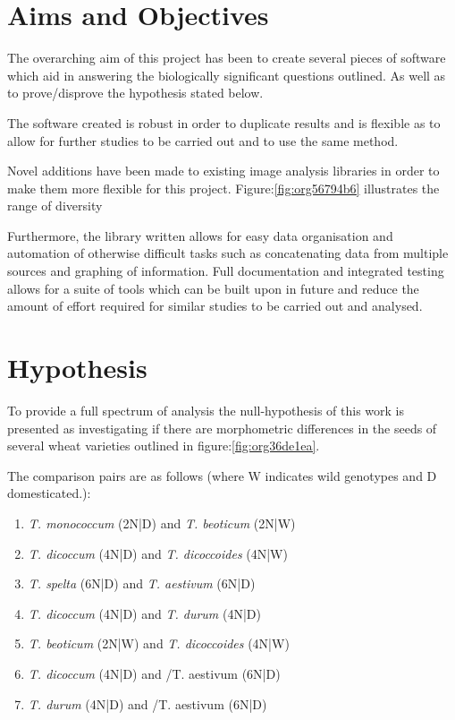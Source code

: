 \documentclass[11pt]{report}
\begin{document}
\section{Aims and Objectives}
\label{sec:orga091535}

The overarching aim of this project has been to create several pieces of software which aid in answering the biologically significant questions outlined. As well as to prove/disprove the hypothesis stated below.

The software created is robust in order to duplicate results and is flexible as to allow for further studies to be carried out and to use the same method.

Novel additions have been made to existing image analysis libraries in order to make them more flexible for this project. Figure:\ref{fig:org56794b6} illustrates the range of diversity

Furthermore, the library written allows for easy data organisation and automation of otherwise difficult tasks such as concatenating data from multiple sources and graphing of information. Full documentation and integrated testing allows for a suite of tools which can be built upon in future and reduce the amount of effort required for similar studies to be carried out and analysed.

\section{Hypothesis}
\label{sec:orga0637ed}
To provide a full spectrum of analysis the null-hypothesis of this work is presented as investigating if there are morphometric differences in the seeds of several wheat varieties outlined in figure:\ref{fig:org36de1ea}.

The comparison pairs are as follows (where W indicates wild genotypes and D domesticated.):

\begin{enumerate}
\item \emph{T. monococcum} (2N|D) and \emph{T. beoticum} (2N|W)
\item \emph{T. dicoccum} (4N|D) and \emph{T. dicoccoides} (4N|W)
\item \emph{T. spelta} (6N|D) and \emph{T. aestivum} (6N|D)
\item \emph{T. dicoccum} (4N|D) and \emph{T. durum} (4N|D)
\item \emph{T. beoticum} (2N|W) and \emph{T. dicoccoides} (4N|W)
\item \emph{T. dicoccum} (4N|D) and /T. aestivum (6N|D)
\item \emph{T. durum} (4N|D) and /T. aestivum (6N|D)
\end{enumerate}
\end{document}
